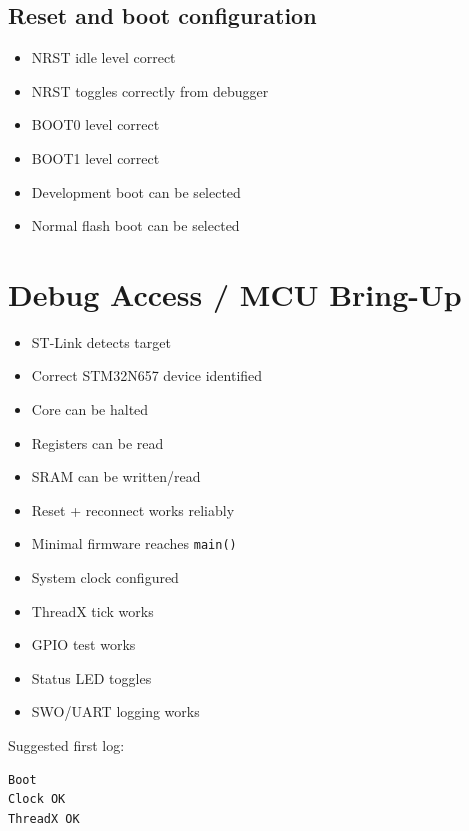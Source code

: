 \documentclass[10pt,a4paper,oneside]{report}
\providecommand{\tightlist}{\setlength{\itemsep}{1pt}\setlength{\parskip}{1pt}}
\begin{document}
\subsection{Reset and boot configuration}\label{wiki-hardware-bring-up-and-testing--42-reset-and-boot-configuration}

\begin{itemize}
\tightlist
\item[$\square$]
  NRST idle level correct
\item[$\square$]
  NRST toggles correctly from debugger
\item[$\square$]
  BOOT0 level correct
\item[$\square$]
  BOOT1 level correct
\item[$\square$]
  Development boot can be selected
\item[$\square$]
  Normal flash boot can be selected
\end{itemize}

\section{Debug Access / MCU Bring-Up}\label{wiki-hardware-bring-up-and-testing--5-debug-access--mcu-bring-up}

\begin{itemize}
\tightlist
\item[$\square$]
  ST-Link detects target
\item[$\square$]
  Correct STM32N657 device identified
\item[$\square$]
  Core can be halted
\item[$\square$]
  Registers can be read
\item[$\square$]
  SRAM can be written/read
\item[$\square$]
  Reset + reconnect works reliably
\item[$\square$]
  Minimal firmware reaches \texttt{main()}
\item[$\square$]
  System clock configured
\item[$\square$]
  ThreadX tick works
\item[$\square$]
  GPIO test works
\item[$\square$]
  Status LED toggles
\item[$\square$]
  SWO/UART logging works
\end{itemize}

Suggested first log:

\begin{verbatim}
Boot
Clock OK
ThreadX OK
\end{verbatim}
\end{document}

